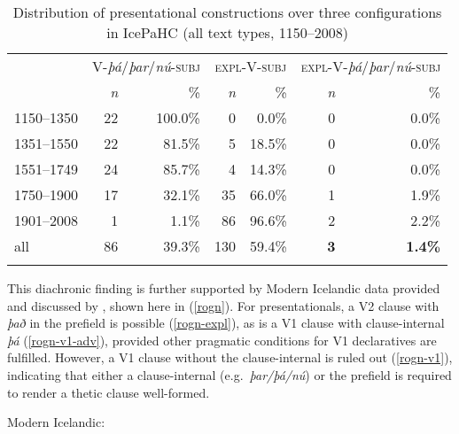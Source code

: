 \documentclass[output=paper,colorlinks,citecolor=brown]{langscibook}
\begin{document}
  \begin{table}
         \setlength{\tabcolsep}{1ex}
        \centering
        \begin{tabular}{lrrrrrr}
        \lsptoprule
        & \multicolumn{2}{c}{V-\textit{þá}/\textit{þar}/\textit{nú}-\textsc{subj}} & \multicolumn{2}{c}{\textsc{expl}-V-\textsc{subj}}  & \multicolumn{2}{c}{\textsc{expl}-V-\textit{þá}/\textit{þar}/\textit{nú}-\textsc{subj}}  \\
          \cmidrule(lr){2-3} \cmidrule(lr){4-5}  \cmidrule(lr){6-7}   
      &  \textit{n} & \% & \textit{n} &  \%  & \textit{n} &  \%   \\
        \midrule
      1150--1350 & 22 & 100.0\% & 0 & 0.0\% & 0 & 0.0\% \\
      1351--1550 & 22 & 81.5\% & 5 & 18.5\% & 0 & 0.0\% \\
      1551--1749 & 24 & 85.7\% & 4 & 14.3\% & 0 & 0.0\% \\
      1750--1900 & 17 & 32.1\% & 35 & 66.0\% & 1 & 1.9\% \\
      1901--2008 & 1 & 1.1\% & 86 & 96.6\% & 2 & 2.2\% \\
       \midrule
     all &  86 & 39.3\% & 130 &  59.4\%  & \textbf{3} &  \textbf{1.4\%} \\
          \lspbottomrule
        \end{tabular}
        \caption{Distribution of presentational constructions over three configurations in IcePaHC (all text types, 1150--2008)}
        \label{tab-dia}
    \end{table}{}

This diachronic finding is further supported by Modern Icelandic data provided and discussed by \citet[78--79]{rognvaldsson1982}, shown here in (\ref{rogn}). For presentationals, a V2 clause with  \textit{það} in the prefield is possible (\ref{rogn-expl}), as is a V1 clause with clause-internal \textit{þá} (\ref{rogn-v1-adv}), provided other pragmatic conditions for V1 declaratives are fulfilled. However, a V1 clause without the clause-internal  is ruled out (\ref{rogn-v1}), indicating that either a clause-internal  (e.g.~\textit{þar/þá/nú}) or the prefield  is required to render a thetic clause well-formed.  

\ea \label{rogn} Modern Icelandic:
\z 
\z 
\end{document}
